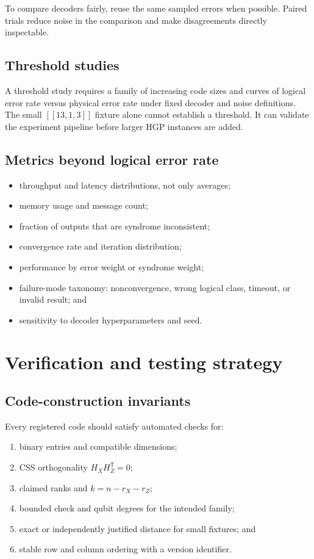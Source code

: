\documentclass[11pt,letterpaper]{article}
\begin{document}
To compare decoders fairly, reuse the same sampled errors when possible. Paired trials reduce noise
in the comparison and make disagreements directly inspectable.

\subsection{Threshold studies}

A threshold study requires a family of increasing code sizes and curves of logical error rate
versus physical error rate under fixed decoder and noise definitions. The small $[[13,1,3]]$
fixture alone cannot establish a threshold. It can validate the experiment pipeline before larger
HGP instances are added.

\subsection{Metrics beyond logical error rate}

\begin{itemize}
  \item throughput and latency distributions, not only averages;
  \item memory usage and message count;
  \item fraction of outputs that are syndrome inconsistent;
  \item convergence rate and iteration distribution;
  \item performance by error weight or syndrome weight;
  \item failure-mode taxonomy: nonconvergence, wrong logical class, timeout, or invalid result; and
  \item sensitivity to decoder hyperparameters and seed.
\end{itemize}

\section{Verification and testing strategy}

\subsection{Code-construction invariants}

Every registered code should satisfy automated checks for:

\begin{enumerate}
  \item binary entries and compatible dimensions;
  \item CSS orthogonality $H_XH_Z^{\mathsf T}=0$;
  \item claimed ranks and $k=n-r_X-r_Z$;
  \item bounded check and qubit degrees for the intended family;
  \item exact or independently justified distance for small fixtures; and
  \item stable row and column ordering with a version identifier.
\end{enumerate}
\end{document}
